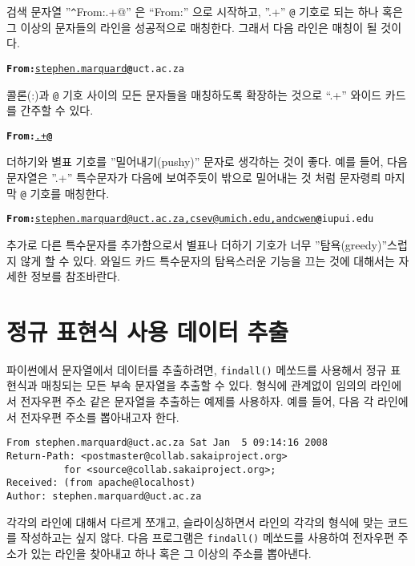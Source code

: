 검색 문자열 ''{\verb"^"}From:.+@'' 은 ``From:'' 으로 시작하고, ''.+'' {\verb"@"} 기호로 되는 하나 혹은 그 이상의 문자들의 라인을 성공적으로 매칭한다.
그래서 다음 라인은 매칭이 될 것이다.

\beforeverb
\begin{alltt}
{\bf From:}\underline{ stephen.marquard}{\bf @}uct.ac.za
\end{alltt}
\afterverb

콜론(:)과  {\verb"@"} 기호 사이의 모든 문자들을 매칭하도록 확장하는 것으로 ``.+'' 와이드 카드를 간주할 수 있다.

\beforeverb
\begin{alltt}
{\bf From:}\underline{.+}{\bf @}
\end{alltt}
\afterverb

더하기와 별표 기호를 ''밀어내기(pushy)'' 문자로 생각하는 것이 좋다. 예를 들어, 다음 문자열은 ''.+'' 특수문자가 다음에 보여주듯이 밖으로 밀어내는 것 처럼 문자령릐 마지막
{\verb"@"} 기호를 매칭한다.

\beforeverb
\begin{alltt}
{\bf From:}\underline{ stephen.marquard@uct.ac.za, csev@umich.edu, and cwen}{\bf @}iupui.edu
\end{alltt}
\afterverb

추가로 다른 특수문자를 추가함으로서 별표나 더하기 기호가 너무 ''탐욕(greedy)''스럽지 않게 할 수 있다.
와일드 카드 특수문자의 탐욕스러운 기능을 끄는 것에 대해서는 자세한 정보를 참조바란다. 


\section{정규 표현식 사용 데이터 추출}

파이썬에서 문자열에서 데이터를 추출하려면, {\tt findall()} 메쏘드를 사용해서 정규 표현식과 매칭되는 모든 부속 문자열을 추출할 수 있다.
형식에 관계없이 임의의 라인에서 전자우편 주소 같은 문자열을 추출하는 예제를 사용하자.
예를 들어, 다음 각 라인에서 전자우편 주소를 뽑아내고자 한다.

\beforeverb
\begin{verbatim}
From stephen.marquard@uct.ac.za Sat Jan  5 09:14:16 2008
Return-Path: <postmaster@collab.sakaiproject.org>
          for <source@collab.sakaiproject.org>;
Received: (from apache@localhost)
Author: stephen.marquard@uct.ac.za
\end{verbatim}
\afterverb
%

각각의 라인에 대해서 다르게 쪼개고, 슬라이싱하면서 라인의 각각의 형식에 맞는 코드를 작성하고는 싶지 않다.
다음 프로그램은 {\tt findall()} 메쏘드를 사용하여 전자우편 주소가 있는 라인을 찾아내고 하나 혹은 그 이상의 주소를 뽑아낸다.

